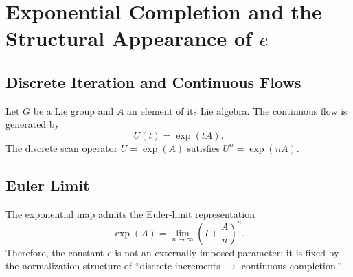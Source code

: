 ﻿\section{Exponential Completion and the Structural Appearance of \texorpdfstring{$e$}{e}}

\subsection{Discrete Iteration and Continuous Flows}

Let $G$ be a Lie group and $A$ an element of its Lie algebra. The continuous flow is generated by
\[
U(t)=\exp(tA).
\]
The discrete scan operator $U=\exp(A)$ satisfies $U^n=\exp(nA)$.

\subsection{Euler Limit}

The exponential map admits the Euler-limit representation
\[
\exp(A)=\lim_{n\to\infty}\left(I+\frac{A}{n}\right)^n.
\]
Therefore, the constant $e$ is not an externally imposed parameter; it is fixed by the normalization structure of ``discrete increments $\to$ continuous completion.''
